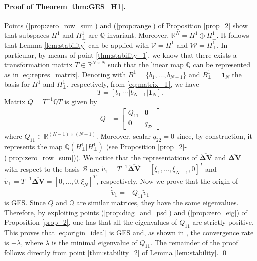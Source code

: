 \documentclass[a4paper]{article}
\theoremstyle{plain}
\newcommand{\Qset}{\mathbb{Q}}
\begin{document}
\paragraph{Proof of Theorem \ref{thm:GES_H1}.}
\label{app:GES_H1}
Points (\ref{prop:zero_row_sum}) and (\ref{prop:range}) of Proposition \ref{prop_2} show that subspaces $H^1$ and $H_{\perp}^1$ are $\mathbb{Q}$-invariant. Moreover, $\mathbb{R}^N = H^1 \oplus H_{\perp}^1$. It follows that Lemma \ref{lem:stability} can be applied with $\mathcal{V} = H^1$ and $\mathcal{W} = H^1_{\perp}$. In particular, by means of point \ref{thm:stability_1}, we know that there exists a transformation matrix $T\in\mathbb{R}^{N\times N}$ such that the linear map $\mathbb{Q}$ can be represented as in \eqref{eq:repres_matrix}. Denoting with $B^1 = \{b_1, \dots, b_{N-1}\}$ and $B_{\perp}^1=\mathbf{1}_N$ the basis for $H^1$ and $H_{\perp}^1$, respectively, from \eqref{eq:matrix_T}, we have
\begin{equation*}
T = [b_1 | \cdots |b_{N-1}|\mathbf{1}_N].
\end{equation*}
Matrix $Q = T^{-1}\mathbb{Q} T $ is given by 
\begin{equation}
\label{eq:ex_A}
\begin{aligned}
Q &=
\begin{bmatrix}
Q_{11} & \mathbf{0}\\ 
\mathbf{0} & q_{22} 
\end{bmatrix}
\end{aligned}
\end{equation}
where $Q_{11}\in\mathbb{R}^{(N-1)\times (N-1)}$. Moreover, scalar $q_{22} = 0$ since, by construction, it represents the map $\mathbb{Q}(H_{\perp}^1|H_{\perp}^1)$ (see Proposition \ref{prop_2}-(\ref{prop:zero_row_sum})). We notice that the representations of $\mathbf{\widehat{\Delta V}}$ and $\mathbf{\overline{\Delta V}}$ with respect to the basis $\mathcal{B}$ are  $\tilde v_1 = T^{-1}\mathbf{\widehat{\Delta V}} = [\xi_1 ,\dots, \xi_{N-1},0]^T$ and $\tilde v_{\perp} = T^{-1}\mathbf{\overline{\Delta V}} = [0 ,\dots, 0,\xi_N]^T$, respectively.
Now we prove that the origin of
\begin{equation}
\label{eq:origin_ideal}
\dot{\tilde{v}}_1 = -Q_{11}\tilde{v}_1
\end{equation}
is GES. Since $Q$ and $\Qset$ are similar matrices, they have the same
eigenvalues. Therefore, by exploiting points (\ref{prop:diag_and_psd}) and (\ref{prop:zero_eig}) of Proposition
\ref{prop_2}, one has that all the eigenvalues of $Q_{11}$
are strictly positive. This proves that \eqref{eq:origin_ideal} is GES
and, as shown in \cite{callier2012linear}, the convergence rate is $-\lambda$, where $\lambda$ is the minimal eigenvalue of $Q_{11}$.
The remainder of the proof follows directly from point \ref{thm:stability_2} of Lemma \ref{lem:stability}. \qed     \newpage
\end{document}
